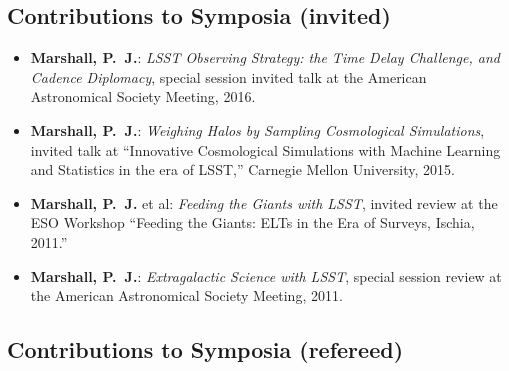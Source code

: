 
\subsection*{Contributions to Symposia (invited)}

\begin{itemize}

\item{\textbf{Marshall, P.~J.}:
\textit{LSST Observing Strategy: the Time Delay Challenge, and Cadence Diplomacy},
special session invited talk at the {American Astronomical Society Meeting}, 2016.
}

\item{\textbf{Marshall, P.~J.}:
\textit{Weighing Halos by Sampling Cosmological Simulations},
invited talk at ``Innovative Cosmological Simulations with Machine Learning and Statistics in the era of LSST,'' Carnegie Mellon University, 2015.
}

\item{\textbf{Marshall, P.~J.} et al:
\textit{Feeding the Giants with LSST},
invited review at the {ESO Workshop ``Feeding the Giants: ELTs in the Era of Surveys}, Ischia, 2011.''
}

\item{\textbf{Marshall, P.~J.}:
\textit{Extragalactic Science with LSST},
special session review at the {American Astronomical Society Meeting}, 2011.
}

\end{itemize}

\vspace{2\baselineskip}


\subsection*{Contributions to Symposia (refereed)}

